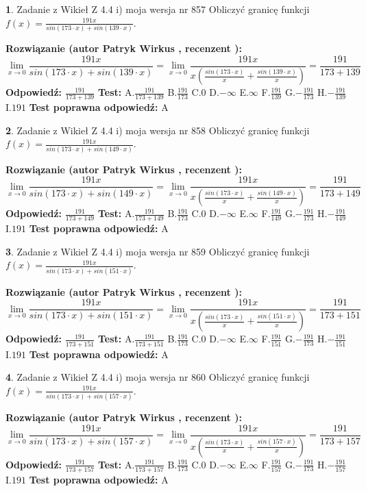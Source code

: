\documentclass[12pt, a4paper]{article}
\theoremstyle{definition} %
\newtheorem{zad}{}
\newcommand{\zadStart}[1]{\begin{zad}#1\newline}
\newcommand{\zadStop}{\end{zad}}
\newcommand{\rozwStart}[2]{\noindent \textbf{Rozwiązanie (autor #1 , recenzent #2): }\newline}
\newcommand{\rozwStop}{\newline}
\newcommand{\odpStart}{\noindent \textbf{Odpowiedź:}\newline}
\newcommand{\odpStop}{\newline}
\newcommand{\testStart}{\noindent \textbf{Test:}\newline}
\newcommand{\testStop}{\newline}
\newcommand{\kluczStart}{\noindent \textbf{Test poprawna odpowiedź:}\newline}
\newcommand{\kluczStop}{\newline}
\begin{document}
\zadStart{Zadanie z Wikieł Z 4.4 i) moja wersja nr 857}
Obliczyć granicę funkcji $f(x)=\frac{191x}{sin(173\cdot x) +sin(139\cdot x)}$.
\zadStop
\rozwStart{Patryk Wirkus}{}
$$\lim\limits_{x\to 0}\frac{191x}{sin(173\cdot x) +sin(139\cdot x)}=\lim\limits_{x\to 0}\frac{191x}{x(\frac{sin(173\cdot x)}{x}+\frac{sin(139\cdot x)}{x})}=\frac{191}{173+139}$$
\rozwStop
\odpStart
$\frac{191}{173+139}$
\odpStop
\testStart
A.$\frac{191}{173+139}$
B.$\frac{191}{173}$
C.$0$
D.$-\infty$
E.$\infty$
F.$\frac{191}{139}$
G.$-\frac{191}{173}$
H.$-\frac{191}{139}$
I.$191$
\testStop
\kluczStart
A
\kluczStop



\zadStart{Zadanie z Wikieł Z 4.4 i) moja wersja nr 858}
Obliczyć granicę funkcji $f(x)=\frac{191x}{sin(173\cdot x) +sin(149\cdot x)}$.
\zadStop
\rozwStart{Patryk Wirkus}{}
$$\lim\limits_{x\to 0}\frac{191x}{sin(173\cdot x) +sin(149\cdot x)}=\lim\limits_{x\to 0}\frac{191x}{x(\frac{sin(173\cdot x)}{x}+\frac{sin(149\cdot x)}{x})}=\frac{191}{173+149}$$
\rozwStop
\odpStart
$\frac{191}{173+149}$
\odpStop
\testStart
A.$\frac{191}{173+149}$
B.$\frac{191}{173}$
C.$0$
D.$-\infty$
E.$\infty$
F.$\frac{191}{149}$
G.$-\frac{191}{173}$
H.$-\frac{191}{149}$
I.$191$
\testStop
\kluczStart
A
\kluczStop



\zadStart{Zadanie z Wikieł Z 4.4 i) moja wersja nr 859}
Obliczyć granicę funkcji $f(x)=\frac{191x}{sin(173\cdot x) +sin(151\cdot x)}$.
\zadStop
\rozwStart{Patryk Wirkus}{}
$$\lim\limits_{x\to 0}\frac{191x}{sin(173\cdot x) +sin(151\cdot x)}=\lim\limits_{x\to 0}\frac{191x}{x(\frac{sin(173\cdot x)}{x}+\frac{sin(151\cdot x)}{x})}=\frac{191}{173+151}$$
\rozwStop
\odpStart
$\frac{191}{173+151}$
\odpStop
\testStart
A.$\frac{191}{173+151}$
B.$\frac{191}{173}$
C.$0$
D.$-\infty$
E.$\infty$
F.$\frac{191}{151}$
G.$-\frac{191}{173}$
H.$-\frac{191}{151}$
I.$191$
\testStop
\kluczStart
A
\kluczStop



\zadStart{Zadanie z Wikieł Z 4.4 i) moja wersja nr 860}
Obliczyć granicę funkcji $f(x)=\frac{191x}{sin(173\cdot x) +sin(157\cdot x)}$.
\zadStop
\rozwStart{Patryk Wirkus}{}
$$\lim\limits_{x\to 0}\frac{191x}{sin(173\cdot x) +sin(157\cdot x)}=\lim\limits_{x\to 0}\frac{191x}{x(\frac{sin(173\cdot x)}{x}+\frac{sin(157\cdot x)}{x})}=\frac{191}{173+157}$$
\rozwStop
\odpStart
$\frac{191}{173+157}$
\odpStop
\testStart
A.$\frac{191}{173+157}$
B.$\frac{191}{173}$
C.$0$
D.$-\infty$
E.$\infty$
F.$\frac{191}{157}$
G.$-\frac{191}{173}$
H.$-\frac{191}{157}$
I.$191$
\testStop
\kluczStart
A
\kluczStop
\end{document}
